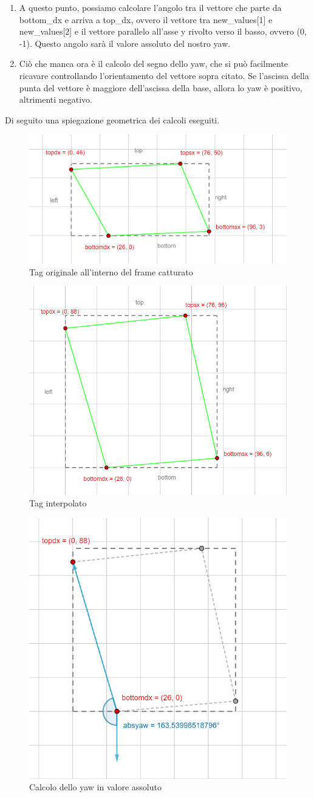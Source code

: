 \documentclass[]{article}
\begin{document}
\begin{enumerate}
    \item A questo punto, possiamo calcolare l'angolo tra il vettore che parte da bottom\_dx e arriva a top\_dx, ovvero il vettore tra new\_values[1] e new\_values[2] e il vettore parallelo all'asse y rivolto verso il basso, ovvero (0, -1). Questo angolo sarà il valore assoluto del nostro yaw.
    \item Ciò che manca ora è il calcolo del segno dello yaw, che si può facilmente ricavare controllando l'orientamento del vettore sopra citato. Se l'ascissa della punta del vettore è maggiore dell'ascissa della base, allora lo yaw è positivo, altrimenti negativo.
\end{enumerate}
Di seguito una spiegazione geometrica dei calcoli eseguiti.
\begin{figure}[H]
    \centering
    \includegraphics[width=0.4\linewidth]{immagini/tag_prima_dell_interpolazione.png}
    \caption{Tag originale all'interno del frame catturato}
\end{figure}
\begin{figure}[H]
    \centering
    \includegraphics[width=0.4\linewidth]{immagini/tag_dopo_interpolazione.png}
    \caption{Tag interpolato}
\end{figure}
\begin{figure}[H]
    \centering
    \includegraphics[width=0.4\linewidth]{immagini/calcolo_yaw.png}
    \caption{Calcolo dello yaw in valore assoluto}
\end{figure}
\end{document}
